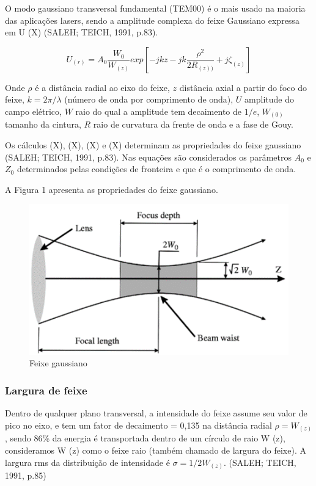 \documentclass[numeric]{fei}
\begin{document}
O modo gaussiano transversal fundamental (TEM00) é o mais usado na maioria das aplicações lasers, sendo a amplitude complexa do feixe Gaussiano expressa em U (X) (SALEH; TEICH, 1991, p.83).

\begin{equation}
\label{eq:gaussiano}
U_{(r)}=A_0\frac{W_0}{W_{(z)}}exp\left [ -jkz-jk\frac{\rho ^2}{2R_{(z))}}+j\zeta_{(z)} \right ]
\end{equation}

Onde $\rho$ é a distância radial ao eixo do feixe, $z$ distância axial a partir do foco do feixe, $k = 2\pi/\lambda$ (número de onda por comprimento de onda), $U$ amplitude do campo elétrico, $W$ raio do qual a amplitude tem decaimento de $1/e$, $W_{(0)}$ tamanho da cintura, $R$ raio de curvatura da frente de onda e a fase de Gouy.

Os cálculos (X), (X), (X) e (X) determinam as propriedades do feixe gaussiano (SALEH; TEICH, 1991, p.83). Nas equações são considerados os parâmetros $A_0$ e $Z_0$ determinados pelas condições de fronteira e   que é o comprimento de onda.

A Figura 1 apresenta as propriedades do feixe gaussiano.

\begin{figure}
\centering
\label{feixe_gaussiano}
\caption{Feixe gaussiano}
\includegraphics{feixe_gaussiano}
\end{figure}

\subsubsection{Largura de feixe}

Dentro de qualquer plano transversal, a intensidade do feixe assume seu valor de pico no eixo, e tem um fator de decaimento = 0,135 na distância radial $\rho = W_{(z)}$, sendo 86\% da energia é transportada dentro de um círculo de raio W (z), consideramos W (z) como o feixe raio (também chamado de largura do feixe). A largura rms da distribuição de intensidade é $\sigma = 1/2W_{(z)}$. (SALEH; TEICH, 1991, p.85)
\end{document}
